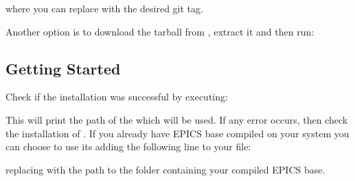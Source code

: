 \documentclass[letterpaper,10pt,english]{sphinxmanual}
\begin{document}
where you can replace  with the desired git tag.

Another option is to download the tarball from , extract it and
then run:

%
\begin{sphinxVerbatim}[commandchars=\\\{\}]
 
  
\end{sphinxVerbatim}


\subsection{Getting Started}
\label{\detokenize{installation:getting-started}}
Check if the installation was successful by executing:

%
\begin{sphinxVerbatim}[commandchars=\\\{\}]
 
\end{sphinxVerbatim}

This will print the path of the  which will be used. If any error
occurs, then check the installation of . If you already have EPICS
base compiled on your system you can choose to use its  adding the following line to your  file:

%
\begin{sphinxVerbatim}[commandchars=\\\{\}]
 
\end{sphinxVerbatim}

replacing  with the path to the folder containing your compiled EPICS base.
\end{document}
